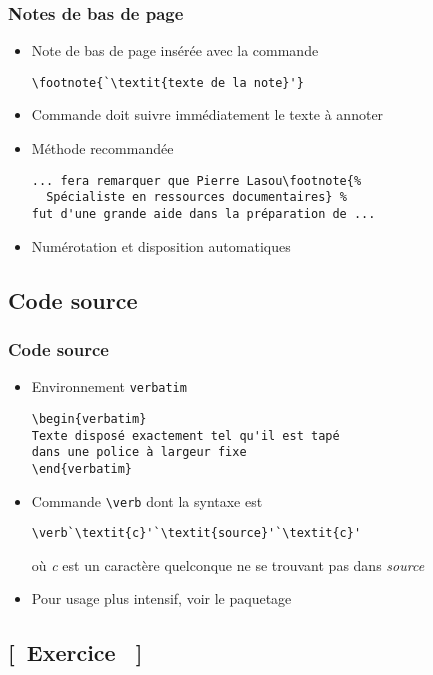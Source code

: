 \begin{frame}[fragile]
  \frametitle{Notes de bas de page}
  \begin{itemize}
  \item Note de bas de page insérée avec la commande
\begin{lstlisting}
\footnote{`\textit{texte de la note}'}
\end{lstlisting}
  \item Commande doit suivre immédiatement le texte à annoter
  \item Méthode recommandée
\begin{lstlisting}[emph=footnote]
... fera remarquer que Pierre Lasou\footnote{%
  Spécialiste en ressources documentaires} %
fut d'une grande aide dans la préparation de ...
\end{lstlisting}
  \item Numérotation et disposition automatiques
  \end{itemize}
\end{frame}

\subsection{Code source}

\begin{frame}[fragile=singleslide]
  \frametitle{Code source}
  \begin{itemize}
  \item Environnement \verb=verbatim=
\begin{lstlisting}
\begin{verbatim}
Texte disposé exactement tel qu'il est tapé
dans une police à largeur fixe
\end{verbatim}
\end{lstlisting}
  \item Commande \verb=\verb= dont la syntaxe est
\begin{lstlisting}
\verb`\textit{c}'`\textit{source}'`\textit{c}'
\end{lstlisting}
    où \textit{c} est un caractère quelconque ne se trouvant pas dans
    \textit{source}
  \item Pour usage plus intensif, voir le paquetage 
  \end{itemize}
\end{frame}

\subsection{[~Exercice \theexerciceref~]}

